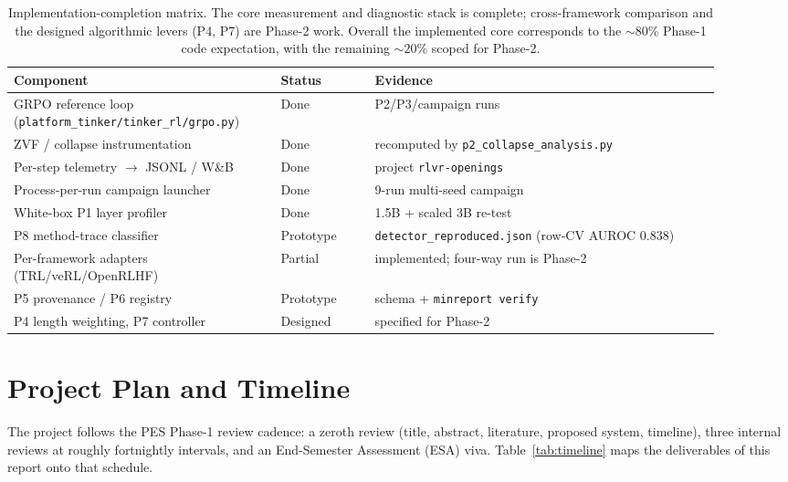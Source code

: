\begin{table}[h]
\centering\small
\begin{tabular}{@{}L{0.34\linewidth}L{0.12\linewidth}L{0.44\linewidth}@{}}
\toprule
\textbf{Component} & \textbf{Status} & \textbf{Evidence} \\
\midrule
GRPO reference loop (\texttt{platform\_\-tinker/\allowbreak tinker\_\-rl/\allowbreak grpo.py}) & Done & P2/P3/campaign runs \\
ZVF / collapse instrumentation & Done & recomputed by \texttt{p2\_\-collapse\_\-analysis.py} \\
Per-step telemetry $\to$ JSONL / W\&B & Done & project \texttt{rlvr-openings} \\
Process-per-run campaign launcher & Done & 9-run multi-seed campaign \\
White-box P1 layer profiler & Done & 1.5B + scaled 3B re-test \\
P8 method-trace classifier & Prototype & \texttt{detector\_\-reproduced.json} (row-CV AUROC $0.838$) \\
Per-framework adapters (TRL/veRL/OpenRLHF) & Partial & implemented; four-way run is Phase-2 \\
P5 provenance / P6 registry & Prototype & schema + \texttt{minreport verify} \\
P4 length weighting, P7 controller & Designed & specified for Phase-2 \\
\bottomrule
\end{tabular}
\caption{Implementation-completion matrix. The core measurement and diagnostic stack is
complete; cross-framework comparison and the designed algorithmic levers (P4, P7) are
Phase-2 work. Overall the implemented core corresponds to the ${\sim}80\%$
Phase-1 code expectation, with the remaining ${\sim}20\%$ scoped for Phase-2.}
\label{tab:impl}
\end{table}

\section{Project Plan and Timeline}
The project follows the PES Phase-1 review cadence: a zeroth review (title, abstract,
literature, proposed system, timeline), three internal reviews at roughly fortnightly
intervals, and an End-Semester Assessment (ESA) viva. Table~\ref{tab:timeline} maps the
deliverables of this report onto that schedule.

